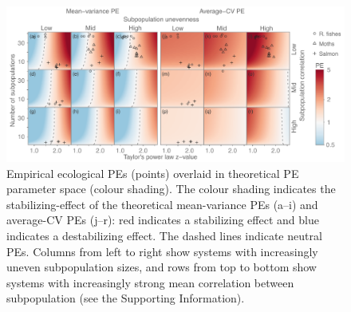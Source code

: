\clearpage
\begin{figure}[htbp]
  \centering
  \includegraphics[width=\textwidth]{prophets/fig5}
  \caption{
  Empirical ecological PEs (points) overlaid in theoretical PE
    parameter space (colour shading). The colour shading indicates the
    stabilizing-effect of the theoretical mean-variance PEs (a--i) and
    average-CV PEs (j--r): red indicates a stabilizing effect and blue indicates
    a destabilizing effect.
    The dashed lines indicate neutral PEs. Columns from left to right
    show systems with increasingly uneven subpopulation sizes,
    and rows from top to bottom show systems with increasingly strong mean
    correlation between subpopulation (see the Supporting
    Information).
  } \label{fig:paramspace}
\end{figure}

